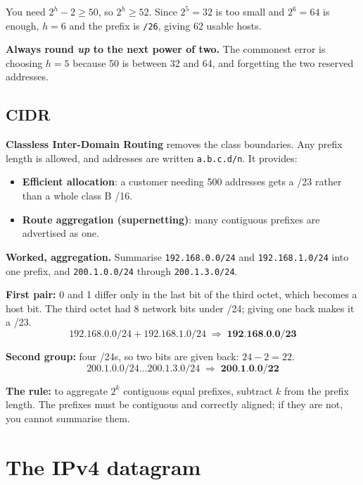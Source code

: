 \documentclass[11pt,a4paper]{article}
\begin{document}
\begin{solbox}
You need $2^h - 2 \ge 50$, so $2^h \ge 52$. Since $2^5 = 32$ is too small and $2^6 = 64$ is enough, $h = 6$ and the prefix is \texttt{/26}, giving 62 usable hosts.

\textbf{Always round \emph{up} to the next power of two.} The commonest error is choosing $h = 5$ because 50 is between 32 and 64, and forgetting the two reserved addresses.
\end{solbox}

\subsection{CIDR}

\textbf{Classless Inter-Domain Routing} removes the class boundaries. Any prefix length is allowed, and addresses are written \texttt{a.b.c.d/n}. It provides:

\begin{itemize}
\item \textbf{Efficient allocation}: a customer needing 500 addresses gets a /23 rather than a whole class B /16.
\item \textbf{Route aggregation (supernetting)}: many contiguous prefixes are advertised as one.
\end{itemize}

\begin{exambox}
\textbf{Worked, aggregation.} Summarise \texttt{192.168.0.0/24} and \texttt{192.168.1.0/24} into one prefix, and \texttt{200.1.0.0/24} through \texttt{200.1.3.0/24}.
\end{exambox}

\begin{solbox}
\textbf{First pair:} 0 and 1 differ only in the last bit of the third octet, which becomes a host bit. The third octet had 8 network bits under /24; giving one back makes it a /23.
\[
192.168.0.0/24 + 192.168.1.0/24 \;\Rightarrow\; \textbf{192.168.0.0/23}
\]

\textbf{Second group:} four /24s, so two bits are given back: $24 - 2 = 22$.
\[
200.1.0.0/24 \ldots 200.1.3.0/24 \;\Rightarrow\; \textbf{200.1.0.0/22}
\]

\textbf{The rule:} to aggregate $2^k$ contiguous equal prefixes, subtract $k$ from the prefix length. The prefixes must be contiguous and correctly aligned; if they are not, you cannot summarise them.
\end{solbox}

\section{The IPv4 datagram}
\end{document}
